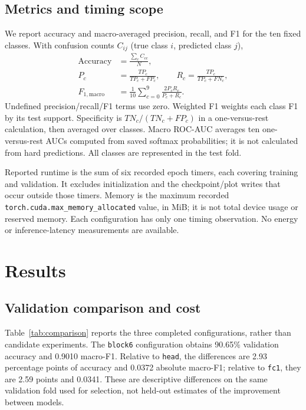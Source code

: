 \documentclass[conference]{IEEEtran}
\newcommand{\code}[1]{\texttt{#1}}
\begin{document}
\subsection{Metrics and timing scope}
We report accuracy and macro-averaged precision, recall, and F1 for the ten fixed classes. With confusion counts $C_{ij}$ (true class $i$, predicted class $j$),
\begin{align}
\mathrm{Accuracy}&=\frac{\sum_c C_{cc}}{N},\\
P_c&=\frac{TP_c}{TP_c+FP_c},\qquad
R_c=\frac{TP_c}{TP_c+FN_c},\\
F_{1,\mathrm{macro}}&=\frac{1}{10}\sum_{c=0}^{9}\frac{2P_cR_c}{P_c+R_c}.
\end{align}
Undefined precision/recall/F1 terms use zero. Weighted F1 weights each class F1 by its test support. Specificity is $TN_c/(TN_c+FP_c)$ in a one-versus-rest calculation, then averaged over classes. Macro ROC-AUC averages ten one-versus-rest AUCs computed from saved softmax probabilities; it is not calculated from hard predictions. All classes are represented in the test fold.

Reported runtime is the sum of six recorded epoch timers, each covering training and validation. It excludes initialization and the checkpoint/plot writes that occur outside those timers. Memory is the maximum recorded \code{torch.cuda.max\_memory\_allocated} value, in MiB; it is not total device usage or reserved memory. Each configuration has only one timing observation. No energy or inference-latency measurements are available.

\section{Results}\label{sec:results}
\subsection{Validation comparison and cost}
Table~\ref{tab:comparison} reports the three completed configurations, rather than candidate experiments. The \code{block6} configuration obtains 90.65\% validation accuracy and 0.9010 macro-F1. Relative to \code{head}, the differences are 2.93 percentage points of accuracy and 0.0372 absolute macro-F1; relative to \code{fc1}, they are 2.59 points and 0.0341. These are descriptive differences on the same validation fold used for selection, not held-out estimates of the improvement between models.
\end{document}
